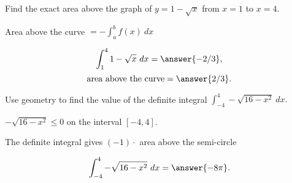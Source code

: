 \documentclass{ximera}
\begin{document}
\begin{problem}
Find the exact area above the graph of $y = 1 - \sqrt x$ from $x = 1$ to $x = 4$. \\
\begin{hint}
Area above the curve $= -\int_a^b f(x) \ dx$
\end{hint}
\[\int_1^4 1 - \sqrt x \ dx = \answer{-2/3},\]
\[\text{area above the curve} = \answer{2/3}.\]
\end{problem}

\begin{problem}
Use geometry to find the value of the definite integral $\displaystyle{\int_{-4}^{4}-\sqrt{16-x^2} \ dx}.$
\begin{hint}
$-\sqrt{16-x^2} \leq 0$ on the interval $[-4,4]$.
\end{hint}
\begin{hint}
The definite integral gives $(-1) \cdot$ area above the semi-circle
\end{hint}
\[\int_{-4}^{4}-\sqrt{16-x^2} \ dx = \answer{-8\pi}.\]
\end{problem}
\end{document}
